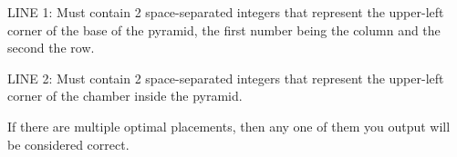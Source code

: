 LINE 1: Must contain 2 space-separated integers that represent the
upper-left corner of the base of the pyramid, the first number
being the column and the second the row.

LINE 2: Must contain 2 space-separated integers that represent the
upper-left corner of the chamber inside the pyramid.

If there are multiple optimal placements, then any one of them you output will be
considered correct.